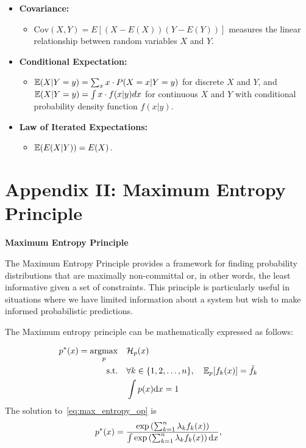 \documentclass{article}
\begin{document}
\begin{itemize}
\begin{itemize}
        \item \textbf{Covariance:}
        \begin{itemize}
            \item $\text{Cov}(X, Y) = E[(X - E(X))(Y - E(Y))]$ measures the linear relationship between random variables $X$ and $Y$.
        \end{itemize}
        \item \textbf{Conditional Expectation:}
        \begin{itemize}
            \item ${\mathbb E}(X|Y=y) = \sum_{x} x \cdot P(X = x|Y = y)$ for discrete $X$ and $Y$, and ${\mathbb E}(X|Y=y) = \int x \cdot f(x|y) dx$ for continuous $X$ and $Y$ with conditional probability density function $f(x|y)$.
        \end{itemize}        
        \item \textbf{Law of Iterated Expectations:} 
        \begin{itemize}
            \item ${\mathbb E}(E(X|Y)) = E(X)$.
        \end{itemize}

    
    \end{itemize}
    

\end{itemize}
\section{Appendix II: Maximum Entropy Principle}

\textbf{Maximum Entropy Principle}

The Maximum Entropy Principle provides a framework for finding probability distributions that are maximally non-committal or, in other words, the least informative given a set of constraints. This principle is particularly useful in situations where we have limited information about a system but wish to make informed probabilistic predictions.

The Maximum entropy principle can be mathematically expressed as follows:


\begin{subequations}\label{eq:max_entropy_op}
\begin{align}
p^*(x) = \operatorname*{argmax}_p \quad &{\mathcal H}_p(x) \label{eq:max_entropy_op.a}\\
\text{s.t.} \quad & \forall k \in\{1, 2, \ldots, n\}, \quad {\mathbb E}_p[f_k(x)] = \tilde f_k \label{eq:max_entropy_op.b}\\
&\int p(x) {\rm d}x = 1 \label{eq:max_entropy_op.c}
\end{align}
\end{subequations}
The solution to~\eqref{eq:max_entropy_op} is 
\begin{align}
    p^*(x) = \frac{\exp\left( \sum_{k=1}^n \lambda_k f_k(x) \right)}{\int \exp\left(\sum_{k=1}^n \lambda_k f_k(x)\right){\rm d}x},
\end{align}
\end{document}
